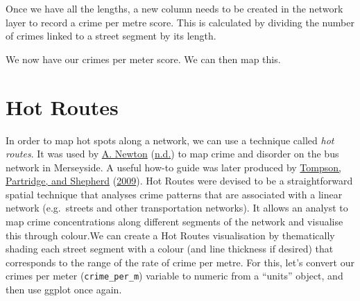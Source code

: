 \documentclass[
  krantz2]{krantz}
\makeatletter
\newenvironment{Shaded}{\begin{snugshade}}{\end{snugshade}}
\newcommand{\NormalTok}[1]{#1}
\newcommand{\OtherTok}[1]{\textcolor[rgb]{0.37,0.37,0.37}{#1}}
\newcommand{\SpecialCharTok}[1]{\textcolor[rgb]{0,0,0}{#1}}
\newenvironment{kframe}{%
\medskip{}
\setlength{\fboxsep}{.8em}
 \def\at@end@of@kframe{}%
 \ifinner\ifhmode%
  \def\at@end@of@kframe{\end{minipage}}%
  \begin{minipage}{\columnwidth}%
 \fi\fi%
 \def\FrameCommand##1{\hskip\@totalleftmargin \hskip-\fboxsep
 \colorbox{shadecolor}{##1}\hskip-\fboxsep
     \hskip-\linewidth \hskip-\@totalleftmargin \hskip\columnwidth}%
 \MakeFramed {\advance\hsize-\width
   \@totalleftmargin\z@ \linewidth\hsize
   \@setminipage}}%
 {\par\unskip\endMakeFramed%
 \at@end@of@kframe}
\renewenvironment{Shaded}{\begin{kframe}}{\end{kframe}}
\makeatother
\begin{document}
Once we have all the lengths, a new column needs to be created in the network layer to record a crime per metre score. This is calculated by dividing the number of crimes linked to a street segment by its length.

\begin{Shaded}
\end{Shaded}

We now have our crimes per meter score. We can then map this.

\hypertarget{hot-routes}{%
\section{Hot Routes}\label{hot-routes}}

In order to map hot spots along a network, we can use a technique called \emph{hot routes}. It was used by \protect\hyperlink{ref-Newton_2008}{A. Newton} (\protect\hyperlink{ref-Newton_2008}{n.d.}) to map crime and disorder on the bus network in Merseyside. A useful how-to guide was later produced by \protect\hyperlink{ref-Tompson_2009}{Tompson, Partridge, and Shepherd} (\protect\hyperlink{ref-Tompson_2009}{2009}). Hot Routes were devised to be a straightforward spatial technique that analyses crime patterns that are associated with a linear network (e.g.~streets and other transportation networks). It allows an analyst to map crime concentrations along different segments of the network and visualise this through colour.We can create a Hot Routes visualisation by thematically shading each street segment with a colour (and line thickness if desired) that corresponds to the range of the rate of crime per metre. For this, let's convert our crimes per meter (\texttt{crime\_per\_m}) variable to numeric from a ``units'' object, and then use ggplot once again.
\end{document}
